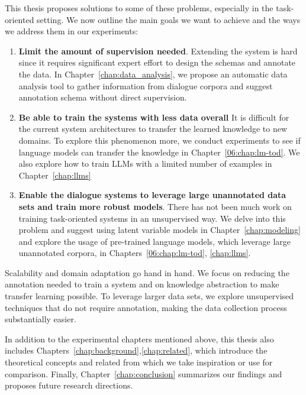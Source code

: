 This thesis proposes solutions to some of these problems, especially in the task-oriented setting.
We now outline the main goals we want to achieve and the ways we address them in our experiments:
\begin{enumerate}
    \item \textbf{Limit the amount of supervision needed}. Extending the system is hard since it requires significant expert effort to design the schemas and annotate the data. In Chapter~\ref{chap:data_analysis}, we propose an automatic data analysis tool to gather information from dialogue corpora and suggest annotation schema without direct supervision.
    \item \textbf{Be able to train the systems with less data overall} It is difficult for the current system architectures to transfer the learned knowledge to new domains. To explore this phenomenon more, we conduct experiments to see if language models can transfer the knowledge in Chapter~\ref{06:chap:lm-tod}. We also explore how to train LLMs with a limited number of examples in Chapter~\ref{chap:llms}
    \item \textbf{Enable the dialogue systems to leverage large unannotated data sets and train more robust models}. There has not been much work on training task-oriented systems in an unsupervised way. We delve into this problem and suggest using latent variable models in Chapter~\ref{chap:modeling} and explore the usage of pre-trained language models, which leverage large unannotated corpora, in Chapters~\ref{06:chap:lm-tod}, \ref{chap:llms}.
\end{enumerate}

Scalability and domain adaptation go hand in hand.
We focus on reducing the annotation needed to train a system and on knowledge abstraction to make transfer learning possible.
To leverage larger data sets, we explore unsupervised techniques that do not require annotation, making the data collection process substantially easier.

In addition to the experimental chapters mentioned above, this thesis also includes Chapters~\ref{chap:background},\ref{chap:related}, which introduce the theoretical concepts and related from which we take inspiration or use for comparison.
Finally, Chapter~\ref{chap:conclusion} summarizes our findings and proposes future research directions.



